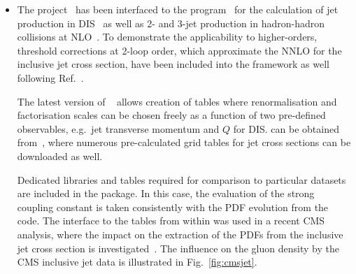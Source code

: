 \begin{itemize}
  \item The \fastnlo project~\cite{Kluge:2006xs} has been interfaced
    to the \nlojetpp program~\cite{Nagy:1998bb} for the calculation of
    jet production in DIS~\cite{Nagy:2001xb} as well as 2- and 3-jet
    production in hadron-hadron collisions at
    NLO~\cite{Nagy:2003tz,Nagy:2001fj}. To demonstrate the
    applicability to higher-orders, threshold corrections at 2-loop
    order, which approximate the NNLO for the inclusive jet cross
    section, have been included into the framework as
    well~\cite{Wobisch:2011ij} following Ref.~\cite{Kidonakis:2000gi}.

    The latest version of \fastnlo~\cite{Britzger:2012bs} allows 
    creation of tables where renormalisation and factorisation scales
    can be chosen
    freely as a function of two pre-defined observables, e.g.\ jet
    transverse momentum \pperp and $Q$ for DIS\@. 
    \fastnlo can be obtained from~\cite{fastNLO:HepForge}, where
    numerous pre-calculated grid tables for jet cross sections can be
    downloaded as well. 

    Dedicated \fastnlo libraries and tables required for comparison to
    particular datasets are included in the \fitter package. In this
    case, the evaluation of the strong coupling constant is taken
    consistently with the PDF evolution from the \qcdnum code. The
    interface to the \fastnlo tables from within \fitter was used in a
    recent CMS analysis, where the impact on the
    extraction of the PDFs from the inclusive jet cross section is
    investigated~\cite{cms:jets}. The influence on the gluon density by
    the CMS inclusive jet data is illustrated in Fig.~\ref{fig:cmsjet}.


\end{itemize}
